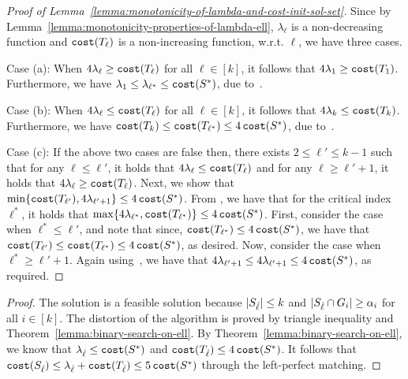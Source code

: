 \documentclass{article}
\begin{document}
\monotonicityoflambdacost*
\begin{proof}[Proof of Lemma~\ref{lemma:monotonicity-of-lambda-and-cost-init-sol-set}]
    Since by Lemma~\ref{lemma:monotonicity-properties-of-lambda-ell}, $\lambda_{\ell}$ is a non-de\-creas\-ing function and $\texttt{cost}(T_{\ell})$ is a non-increasing function, w.r.t. $\ell$, we have three cases.
    
    Case (a): When $4 \lambda_{\ell} \geq \texttt{cost}(T_{\ell})$ for all $\ell \in [k]$, it follows that $4 \lambda_{1} \geq \texttt{cost}(T_{1})$.
    Furthermore, we have $\lambda_1 \le \lambda_{\ell^*} \le  \texttt{cost}(S^*)$, due to~.

    Case (b): When $4 \lambda_{\ell} \leq \texttt{cost}(T_{\ell})$ for all $\ell \in [k]$, it follows that $4 \lambda_{k} \leq \texttt{cost}(T_{k})$. 
    Furthermore, we have $\texttt{cost}(T_{k}) \leq \texttt{cost}(T_{\ell^*}) \leq 4\,\texttt{cost}(S^*)$,  due to~.

    Case (c): If the above two cases are false then, there exists $2 \leq \ell' \leq k-1$ such that for any $\ell \leq \ell'$, it holds that $4 \lambda_{\ell} \leq \texttt{cost}(T_{\ell})$ and for any $\ell \geq \ell' + 1$, it holds that $4 \lambda_{\ell} \geq \texttt{cost}(T_{\ell})$.
    Next, we show that $\min \{\texttt{cost}(T_{\ell'}), 4 \lambda_{\ell' + 1}\} \leq 4\,\texttt{cost}(S^*)$. From , we have that for the critical index $\ell^*$, it holds that $\max\{4\lambda_{\ell^*}, \texttt{cost}(T_{\ell^*})\}\leq 4\, \texttt{cost}(S^*)$. First, consider the case when $\ell^* \le \ell'$, and note that since, $ \texttt{cost}(T_{\ell^*}) \leq 4\, \texttt{cost}(S^*)$, we have that $\texttt{cost}(T_{\ell'}) \le  \texttt{cost}(T_{\ell^*})\leq 4\, \texttt{cost}(S^*)$, as desired. Now, consider the case when $\ell^* \geq \ell'+1$. Again using~, we have that $4\lambda_{\ell'+1} \leq 4\lambda_{\ell'+1} \leq 4\, \texttt{cost}(S^*)$, as required.
\end{proof}

\getfeasiblesolution*
\begin{proof}
    The solution is a feasible solution because $\lvert S_{\hat{\ell}} \rvert  \leq k$ and $\lvert S_{\hat{\ell}} \cap G_i \rvert  \geq \alpha_i$ for all $i \in [k]$.
    The distortion of the algorithm is proved by triangle inequality and Theorem~\ref{lemma:binary-search-on-ell}. 
    By Theorem~\ref{lemma:binary-search-on-ell}, we know that $\lambda_{\hat{\ell}} \leq \texttt{cost}(S^*)$ and $\texttt{cost}(T_{\hat{\ell}}) \leq 4\, \texttt{cost}(S^*)$. 
    It follows that $\texttt{cost}(S_{\hat{\ell}}) \leq \lambda_{\hat{\ell}} + \texttt{cost}(T_{\hat{\ell}}) \leq 5\, \texttt{cost}(S^*)$ through the left-perfect matching. 
\end{proof}
\end{document}
